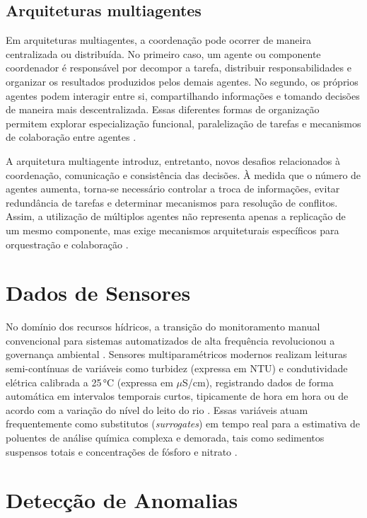\subsection{Arquiteturas multiagentes}

Em arquiteturas multiagentes, a coordenação pode ocorrer de maneira centralizada ou distribuída. No primeiro caso, um agente ou componente coordenador é responsável por decompor a tarefa, distribuir responsabilidades e organizar os resultados produzidos pelos demais agentes. No segundo, os próprios agentes podem interagir entre si, compartilhando informações e tomando decisões de maneira mais descentralizada. Essas diferentes formas de organização permitem explorar especialização funcional, paralelização de tarefas e mecanismos de colaboração entre agentes \cite{cheng2026,zhao2026survey}.

A arquitetura multiagente introduz, entretanto, novos desafios relacionados à coordenação, comunicação e consistência das decisões. À medida que o número de agentes aumenta, torna-se necessário controlar a troca de informações, evitar redundância de tarefas e determinar mecanismos para resolução de conflitos. Assim, a utilização de múltiplos agentes não representa apenas a replicação de um mesmo componente, mas exige mecanismos arquiteturais específicos para orquestração e colaboração \cite{cheng2026}.

\section{Dados de Sensores}
\label{sec:dados_sensores}

No domínio dos recursos hídricos, a transição do monitoramento manual convencional para sistemas automatizados de alta frequência revolucionou a governança ambiental \cite{leigh2019framework}. Sensores multiparamétricos modernos realizam leituras semi-contínuas de variáveis como turbidez (expressa em NTU) e condutividade elétrica calibrada a 25\,°C (expressa em $\mu$S/cm), registrando dados de forma automática em intervalos temporais curtos, tipicamente de hora em hora ou de acordo com a variação do nível do leito do rio \cite{leigh2019framework}. Essas variáveis atuam frequentemente como substitutos (\textit{surrogates}) em tempo real para a estimativa de poluentes de análise química complexa e demorada, tais como sedimentos suspensos totais e concentrações de fósforo e nitrato \cite{leigh2019framework}.


\section{Detecção de Anomalias}
\label{sec:deteccao_anomalias}

